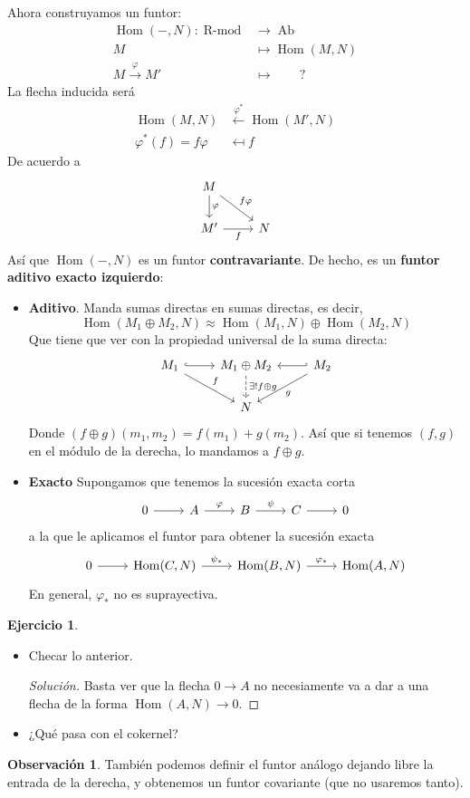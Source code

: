 \documentclass[spanish]{book}
\theoremstyle{definition}
\newtheorem*{obs}{Observación}
\newtheorem*{ejer}{Ejercicio}
\DeclareMathOperator{\RMod}{R\text{-}mod}
\DeclareMathOperator{\Ab}{Ab}
\DeclareMathOperator{\Hom}{Hom}
\begin{document}
Ahora construyamos un funtor:
\begin{align*}
	\Hom(-,N):\RMod&\to\Ab\\
	M&\mapsto\Hom(M,N)\\
	M\xrightarrow{\varphi} M'&\mapsto \qquad?
\end{align*}
La flecha inducida será
\begin{align*}
	\Hom(M,N)&\xleftarrow{\varphi^*}\Hom(M',N)\\
	\varphi^*(f)=f\varphi&\mapsfrom f
\end{align*}
De acuerdo a
\[\begin{tikzcd}
	M\arrow[d,"\varphi"]\arrow[rd,"f\varphi"]\\
	M'\arrow[r,swap,"f"]&N
\end{tikzcd}\]
Así que $\Hom(-,N)$ es un funtor \textbf{contravariante}. De hecho, es un \textbf{funtor aditivo exacto izquierdo}:
\begin{itemize}
	\item \textbf{Aditivo}. Manda sumas directas en sumas directas, es decir,
	\[\Hom(M_1\oplus M_2,N)\approx \Hom(M_1,N)\oplus\Hom(M_2,N)\]
	Que tiene que ver con la propiedad universal de la suma directa:
	\[\begin{tikzcd}
		M_1\arrow[r,hook]\arrow[rd,"f"]&M_1\oplus M_2\arrow[d,dashed,"\exists! f\oplus g"]&M_2\arrow[l,hook']\arrow[dl,"g"]\\
		&N
	\end{tikzcd}\]
	Donde $(f\oplus g)(m_1,m_2)=f(m_1)+g(m_2)$. Así que si tenemos $(f,g)$ en el módulo de la derecha, lo mandamos a $f\oplus g$.
	\item \textbf{Exacto} Supongamos que tenemos la sucesión exacta corta
	\[\begin{tikzcd}
		0\arrow[r]&A\arrow[r,"\varphi"]&B\arrow[r,"\psi"]&C\arrow[r]&0
	\end{tikzcd}\]
	a la que le aplicamos el funtor para obtener la sucesión exacta
	\[\begin{tikzcd}
		0\arrow[r]&\Hom(C,N)\arrow[r,"\psi_*"]&\Hom(B,N)\arrow[r,"\varphi_*"]&\Hom(A,N)
	\end{tikzcd}\]
	En general, $\varphi_*$ no es suprayectiva.
\end{itemize}

\begin{ejer}
	\begin{itemize}\leavevmode
		\item Checar lo anterior.
		\begin{proof}[Solución]
			Basta ver que la flecha $0\to A$ no necesiamente va a dar a una flecha de la forma $\Hom(A,N)\to0$.
		\end{proof}
		\item ¿Qué pasa con el cokernel?
	\end{itemize}
\end{ejer}
\begin{obs}
	También podemos definir el funtor análogo dejando libre la entrada de la derecha, y obtenemos un funtor covariante (que no usaremos tanto).
\end{obs}
\end{document}
